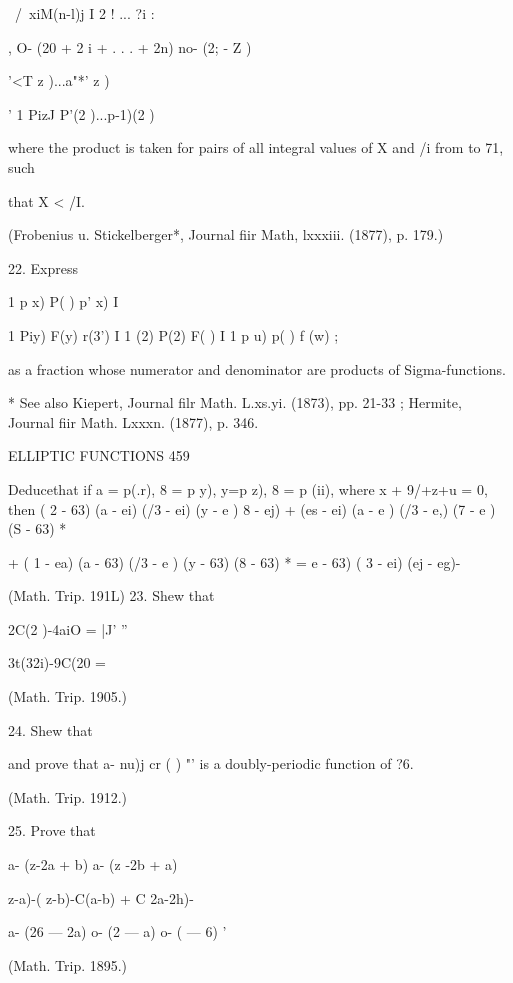 {\ /\ xiM(n-l)j I 2 ! ... ?i :



, O- (20 + 2 i + . . . + 2n) no- (2; - Z )

'<T z )...a"*' z )



' 1 PizJ P'(2 )...p-1)(2 )

where the product is taken for pairs of all integral values of X and
/i from to 71, such

that X < /I.

(Frobenius u. Stickelberger*, Journal fiir Math, lxxxiii. (1877), p.
179.)

22. Express

1 p x) P( ) p' x) I

1 Piy) F(y) r(3') I 1 (2) P(2) F( ) I 1 p u) p( ) f (w) ;

as a fraction whose numerator and denominator are products of
Sigma-functions.

* See also Kiepert, Journal filr Math. L.xs.yi. (1873), pp. 21-33 ;
Hermite, Journal fiir Math. Lxxxn. (1877), p. 346.



ELLIPTIC FUNCTIONS 459

Deducethat if a = p(.r), 8 = p y), y=p z), 8 = p (ii), where x +
9/+z+u = 0, then ( 2 - 63) (a - ei) (/3 - ei) (y - e ) 8 - ej) + (es -
ei) (a - e ) (/3 - e,) (7 - e ) (S - 63) *

+ ( 1 - ea) (a - 63) (/3 - e ) (y - 63) (8 - 63) * = e - 63) ( 3 - ei)
(ej - eg)-

(Math. Trip. 191L) 23. Shew that

2C(2 )-4aiO = |J' ''



3t(32i)-9C(20 =






(Math. Trip. 1905.)

24. Shew that

and prove that a- nu)j cr ( ) "' is a doubly-periodic function of ?6.

(Math. Trip. 1912.)

25. Prove that

a- (z-2a + b) a- (z -2b + a)



  z-a)-( z-b)-C(a-b) + C 2a-2h)-



a- (26 — 2a) o- (2 — a) o- ( — 6) '

(Math. Trip. 1895.)

}
